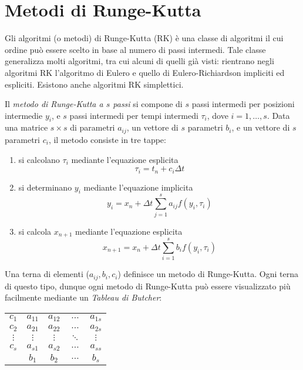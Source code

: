 \section{Metodi di Runge-Kutta}
Gli algoritmi (o metodi) di Runge-Kutta (RK) è una classe di algoritmi il cui ordine può essere scelto in base al numero di passi intermedi. Tale classe generalizza molti algoritmi, tra cui alcuni di quelli già visti: rientrano negli algoritmi RK l'algoritmo di Eulero e quello di Eulero-Richiardson impliciti ed espliciti. Esistono anche algoritmi RK simplettici.

\begin{definition}
Il \emph{metodo di Runge-Kutta a $s$ passi} si compone di $s$ passi intermedi per posizioni intermedie $y_i$, e $s$ passi intermedi per tempi intermedi $\tau_i$, dove $i = 1,\dots,s$. Data una matrice $s \times s$ di parametri $a_{ij}$, un vettore di $s$ parametri $b_i$, e un vettore di $s$ parametri $c_i$, il metodo consiste in tre tappe:
\begin{enumerate}
\item si calcolano $\tau_i$ mediante l'equazione esplicita
\[
\tau_i = t_n + c_i \Delta t
\]
\item si determinano $y_i$ mediante l'equazione implicita
\[
y_i = x_n + \Delta t \sum_{j = 1}^s a_{ij} f(y_i, \tau_i)
\]
\item si calcola $x_{n+1}$ mediante l'equazione esplicita
\[
x_{n+1} = x_n + \Delta t \sum_{i = 1}^s b_i f(y_i, \tau_i)
\]
\end{enumerate}
\end{definition}

Una terna di elementi ($a_{ij}, b_i, c_i$) definisce un metodo di Runge-Kutta. Ogni terna di questo tipo, dunque ogni metodo di Runge-Kutta può essere visualizzato più facilmente mediante un \emph{Tableau di Butcher}:

\begin{center}
\begin{tabular}{c|cccc}
$c_1$ & $a_{11}$ & $a_{12}$ & $\dots$ & $a_{1s}$ \\
$c_2$ & $a_{21}$ & $a_{22}$ & $\dots$ & $a_{2s}$ \\
$\vdots$ & $\vdots$  & $\vdots$ & $\ddots$ & $\vdots$ \\
$c_s$ & $a_{s1}$ & $a_{s2}$ & $\dots$ & $a_{ss}$ \\
\midrule
      & $b_1$ & $b_2$ & $\dots$ & $b_s$ \\
\end{tabular}
\end{center}

